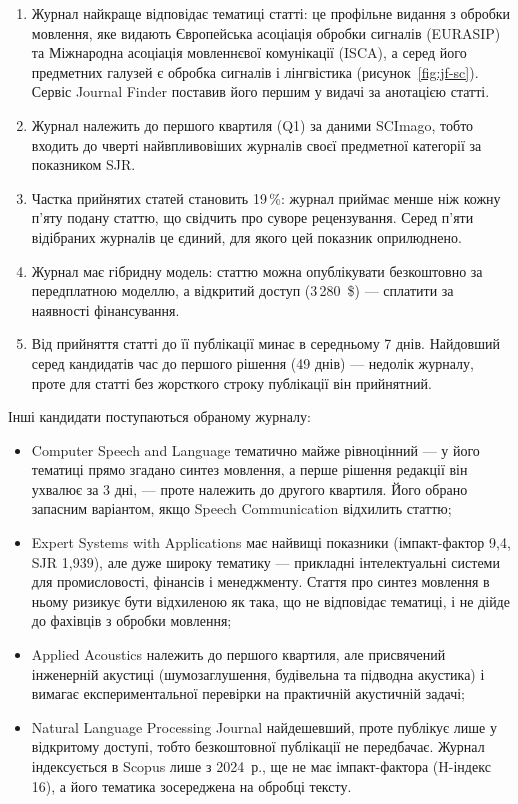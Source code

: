 \documentclass[14pt,a4paper]{extreport}
\begin{document}
\begin{enumerate}
\item Журнал найкраще відповідає тематиці статті: це профільне видання з обробки мовлення, яке видають Європейська асоціація обробки сигналів (EURASIP) та Міжнародна асоціація мовленнєвої комунікації (ISCA), а серед його предметних галузей є обробка сигналів і лінгвістика (рисунок~\ref{fig:jf-sc}). Сервіс Journal Finder поставив його першим у видачі за анотацією статті.
\item Журнал належить до першого квартиля (Q1) за даними SCImago, тобто входить до чверті найвпливовіших журналів своєї предметної категорії за показником SJR.
\item Частка прийнятих статей становить 19\,\%: журнал приймає менше ніж кожну п'яту подану статтю, що свідчить про суворе рецензування. Серед п'яти відібраних журналів це єдиний, для якого цей показник оприлюднено.
\item Журнал має гібридну модель: статтю можна опублікувати безкоштовно за передплатною моделлю, а відкритий доступ (3\,280~\$) — сплатити за наявності фінансування.
\item Від прийняття статті до її публікації минає в середньому 7 днів. Найдовший серед кандидатів час до першого рішення (49 днів) — недолік журналу, проте для статті без жорсткого строку публікації він прийнятний.
\end{enumerate}

Інші кандидати поступаються обраному журналу:

\begin{itemize}
\item Computer Speech and Language тематично майже рівноцінний — у його тематиці прямо згадано синтез мовлення, а перше рішення редакції він ухвалює за 3 дні, — проте належить до другого квартиля. Його обрано запасним варіантом, якщо Speech Communication відхилить статтю;
\item Expert Systems with Applications має найвищі показники (імпакт-фактор 9,4, SJR 1,939), але дуже широку тематику — прикладні інтелектуальні системи для промисловості, фінансів і менеджменту. Стаття про синтез мовлення в ньому ризикує бути відхиленою як така, що не відповідає тематиці, і не дійде до фахівців з обробки мовлення;
\item Applied Acoustics належить до першого квартиля, але присвячений інженерній акустиці (шумозаглушення, будівельна та підводна акустика) і вимагає експериментальної перевірки на практичній акустичній задачі;
\item Natural Language Processing Journal найдешевший, проте публікує лише у відкритому доступі, тобто безкоштовної публікації не передбачає. Журнал індексується в Scopus лише з 2024~р., ще не має імпакт-фактора (H-індекс 16), а його тематика зосереджена на обробці тексту.
\end{itemize}
\end{document}
